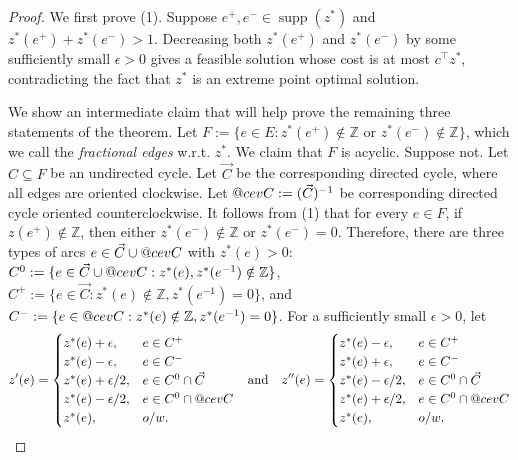 \documentclass[11pt]{article}
\makeatletter
\newcommand{\Z}{\mathbb{Z}}
\DeclareRobustCommand{\cev}[1]{{\mathpalette\do@cev{#1}}}
\newcommand{\do@cev}[2]{\vbox{\offinterlineskip
    \sbox\z@{$\m@th#1 x$}\ialign{##\cr
      \hidewidth\reflectbox{$\m@th#1\vec{}\mkern4mu$}\hidewidth\cr
      \noalign{\kern-\ht\z@}
      $\m@th#1#2$\cr
    }}}
\DeclareMathOperator{\supp}{supp}
\makeatother
\begin{document}
\begin{proof}
        We first prove (1). Suppose $e^+,e^-\in \supp(z^*)$ and $z^*(e^+)+z^*(e^-)>1$. Decreasing both $z^*(e^+)$ and $z^*(e^-)$ by some sufficiently small $\epsilon>0$ gives a feasible solution whose cost is at most $c^\intercal z^*$, 
contradicting the fact that $z^*$ is an extreme point optimal solution.
        
        We show an intermediate claim that will help prove the remaining three statements of the theorem. Let $F:=\{e\in E: z^*(e^+)\notin \Z \text{ or } z^*(e^-)\notin \Z\}$, which we call the \emph{fractional edges} w.r.t. $z^*$. We claim that $F$ is acyclic. Suppose not. Let $C\subseteq F$ be an undirected cycle. Let $\vec{C}$ be the corresponding directed cycle, where all edges are oriented clockwise. Let $\cev{C}:=(\vec{C})^{-1}$ be corresponding directed cycle oriented counterclockwise. It follows from (1) that for every $e\in F$, if $z(e^+)\notin \Z$, then either $z^*(e^-)\notin \Z$ or $z^*(e^-)=0$. Therefore, there are three types of arcs $e\in \vec{C}\cup \cev{C}$ with $z^*(e)>0$: $C^0:=\{e\in \vec{C}\cup \cev{C}: z^*(e),z^*(e^{-1})\notin \Z\}$, $C^+:=\{e\in \vec{C}: z^*(e)\notin \Z, z^*(e^{-1})=0\}$, and $C^-:=\{e\in \cev{C}: z^*(e)\notin \Z, z^*(e^{-1})=0\}$. For a sufficiently small $\epsilon>0$, let
        \[
        \begin{aligned}
            z'(e)=\begin{cases}
            z^*(e)+\epsilon, & e\in C^+\\
            z^*(e)-\epsilon, & e\in C^-\\
            z^*(e)+\epsilon/2, & e\in C^0\cap \vec{C}\\
            z^*(e)-\epsilon/2, & e\in C^0\cap \cev{C}\\
            z^*(e), & o/w.
        \end{cases}
        \end{aligned}
        \quad\text{and}\quad
        \begin{aligned}
            z''(e)=\begin{cases}
            z^*(e)-\epsilon, & e\in C^+\\
            z^*(e)+\epsilon, & e\in C^-\\
            z^*(e)-\epsilon/2, & e\in C^0\cap \vec{C}\\
            z^*(e)+\epsilon/2, & e\in C^0\cap \cev{C}\\
            z^*(e), & o/w.
        \end{cases}
        \end{aligned}
\]
\end{proof}
\end{document}
